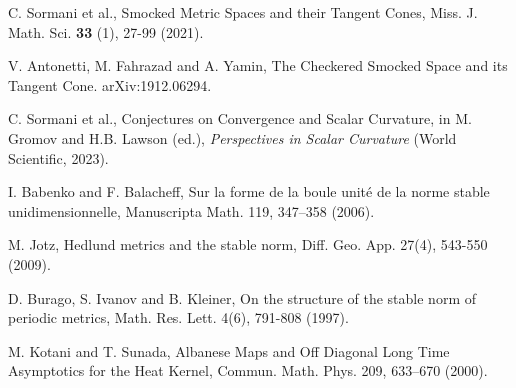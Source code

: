 \documentclass[12pt, letterpaper]{article}
\begin{document}
 



\noindent
[1] C. Sormani et al., Smocked Metric Spaces and their Tangent Cones, Miss. J. Math. Sci. \textbf{33} (1), 27-99 (2021). 

\noindent
[2] V. Antonetti, M. Fahrazad and A. Yamin, The Checkered Smocked Space and its Tangent Cone.  arXiv:1912.06294.


\noindent
[3] C. Sormani et al., Conjectures on Convergence and Scalar Curvature, in M. Gromov and H.B. Lawson (ed.), \textit{Perspectives in Scalar Curvature} (World Scientific, 2023).

\noindent
[4] I. Babenko and F. Balacheff, Sur la forme de la boule unité de la norme stable unidimensionnelle, Manuscripta Math. 119, 347–358 (2006).

\noindent
[5] M. Jotz, Hedlund metrics and the stable norm, Diff. Geo. App. 27(4), 543-550 (2009).

 
 
\noindent
[6] D. Burago, S. Ivanov and B. Kleiner, On the structure of the stable norm of periodic metrics, Math. Res. Lett. 4(6), 791-808 (1997).

\noindent
[7] M. Kotani and T. Sunada, Albanese Maps and Off Diagonal Long Time Asymptotics for the Heat Kernel, Commun. Math. Phys. 209, 633–670 (2000).

 









 

 



\end{document}
